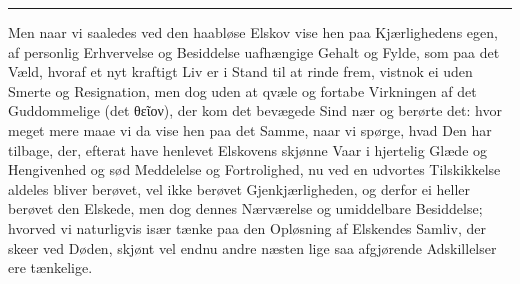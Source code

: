 \documentclass[12pt,a4paper]{book}
\newcommand{\apage}[1]{\marginnote{\footnotesize\textit{[#1]}}}
\begin{document}
\begin{center}\rule{0.28\linewidth}{0.4pt}\end{center}

Men naar vi saaledes ved den haabløse Elskov vise hen paa Kjærlighedens
egen, af personlig Erhvervelse og Besiddelse uafhængige Gehalt og Fylde,
som paa det Væld, hvoraf et nyt kraftigt Liv er i Stand \apage{165} til at rinde
frem, vistnok ei uden Smerte og Resignation, men dog uden at qvæle og
fortabe Virkningen af det Guddommelige (det θεῖον), der kom det bevægede
Sind nær og berørte det: hvor meget mere maae vi da vise hen paa det
Samme, naar vi spørge, hvad Den har tilbage, der, efterat have henlevet
Elskovens skjønne Vaar i hjertelig Glæde og Hengivenhed og sød Meddelelse
og Fortrolighed, nu ved en udvortes Tilskikkelse aldeles bliver berøvet,
vel ikke berøvet Gjenkjærligheden, og derfor ei heller berøvet den
Elskede, men dog dennes Nærværelse og umiddelbare Besiddelse; hvorved vi
naturligvis især tænke paa den Opløsning af Elskendes Samliv, der skeer
ved Døden, skjønt vel endnu andre næsten lige saa afgjørende Adskillelser
ere tænkelige.
\end{document}
